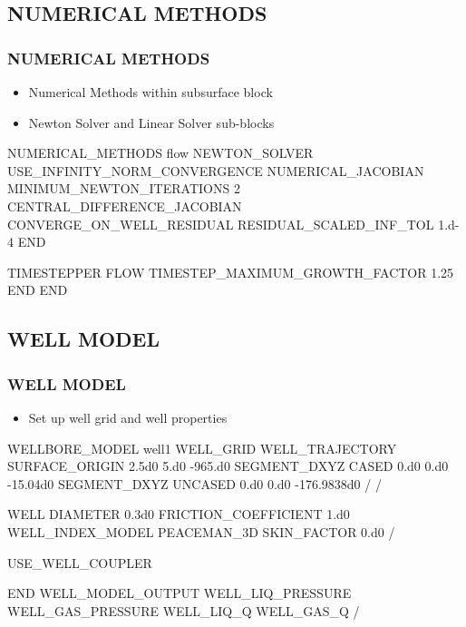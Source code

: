 \documentclass{beamer}
\begin{document}
\subsection{NUMERICAL METHODS}
\begin{frame}[fragile]\frametitle{NUMERICAL METHODS}

\begin{itemize}
  \item Numerical Methods within subsurface block
  \item Newton Solver and Linear Solver sub-blocks
\end{itemize}

\begin{semiverbatim}
NUMERICAL_METHODS flow
  NEWTON_SOLVER
    USE_INFINITY_NORM_CONVERGENCE
    NUMERICAL_JACOBIAN
    MINIMUM_NEWTON_ITERATIONS 2
    CENTRAL_DIFFERENCE_JACOBIAN
    CONVERGE_ON_WELL_RESIDUAL
    RESIDUAL_SCALED_INF_TOL 1.d-4
  END

  TIMESTEPPER FLOW
    TIMESTEP_MAXIMUM_GROWTH_FACTOR 1.25
  END
END

\end{semiverbatim}
\end{frame}

\subsection{WELL MODEL}
\begin{frame}\frametitle{WELL MODEL}

\begin{itemize}
  \item Set up well grid and well properties
\end{itemize}

\begin{semiverbatim}
WELLBORE_MODEL well1
  WELL_GRID
    WELL_TRAJECTORY
      SURFACE_ORIGIN 2.5d0 5.d0 -965.d0
      SEGMENT_DXYZ CASED 0.d0 0.d0 -15.04d0
      SEGMENT_DXYZ UNCASED 0.d0 0.d0 -176.9838d0
    /
  /

\newpage
  WELL
    DIAMETER 0.3d0
    FRICTION_COEFFICIENT 1.d0
    WELL_INDEX_MODEL PEACEMAN_3D
    SKIN_FACTOR 0.d0
  /

  USE_WELL_COUPLER

END
\newpage
WELL_MODEL_OUTPUT
  WELL_LIQ_PRESSURE
  WELL_GAS_PRESSURE
  WELL_LIQ_Q
  WELL_GAS_Q
/

\end{semiverbatim}
\end{frame}
\end{document}
